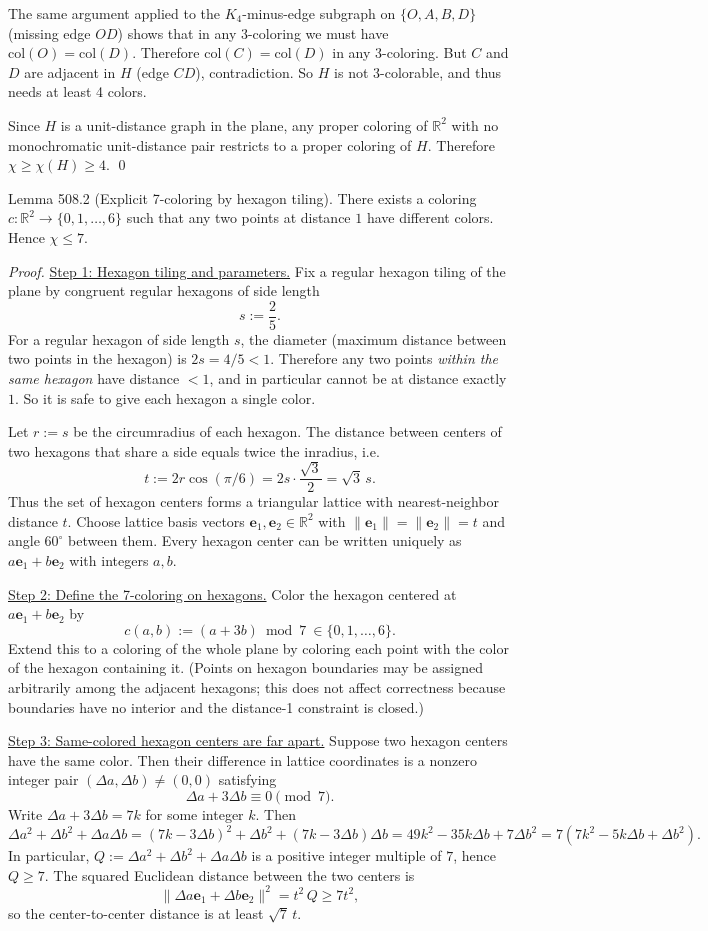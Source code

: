 The same argument applied to the $K_4$-minus-edge subgraph on $\{O,A,B,D\}$ (missing edge $OD$) shows that in any 3-coloring we must have $\mathrm{col}(O)=\mathrm{col}(D)$.
Therefore $\mathrm{col}(C)=\mathrm{col}(D)$ in any 3-coloring.
But $C$ and $D$ are adjacent in $H$ (edge $CD$), contradiction.
So $H$ is not 3-colorable, and thus needs at least 4 colors.

Since $H$ is a unit-distance graph in the plane, any proper coloring of $\mathbb R^2$ with no monochromatic unit-distance pair restricts to a proper coloring of $H$.
Therefore $\chi\ge \chi(H)\ge 4$.
\qed

Lemma 508.2 (Explicit 7-coloring by hexagon tiling).
There exists a coloring $c:\mathbb R^2\to\{0,1,\dots,6\}$ such that any two points at distance $1$ have different colors. Hence $\chi\le 7$.

\emph{Proof.}
\underline{Step 1: Hexagon tiling and parameters.}
Fix a regular hexagon tiling of the plane by congruent regular hexagons of side length
\[s:=\frac{2}{5}.
\]
For a regular hexagon of side length $s$, the diameter (maximum distance between two points in the hexagon) is $2s=4/5<1$.
Therefore any two points \emph{within the same hexagon} have distance $<1$, and in particular cannot be at distance exactly $1$.
So it is safe to give each hexagon a single color.

Let $r:=s$ be the circumradius of each hexagon. The distance between centers of two hexagons that share a side equals twice the inradius, i.e.
\[t:=2r\cos(\pi/6)=2s\cdot \frac{\sqrt3}{2}=\sqrt3\,s.
\]
Thus the set of hexagon centers forms a triangular lattice with nearest-neighbor distance $t$.
Choose lattice basis vectors $\mathbf e_1,\mathbf e_2\in\mathbb R^2$ with $\lVert\mathbf e_1\rVert=\lVert\mathbf e_2\rVert=t$ and angle $60^\circ$ between them.
Every hexagon center can be written uniquely as $a\mathbf e_1+b\mathbf e_2$ with integers $a,b$.

\underline{Step 2: Define the 7-coloring on hexagons.}
Color the hexagon centered at $a\mathbf e_1+b\mathbf e_2$ by
\[c(a,b):= (a+3b)\bmod 7\ \in\{0,1,\dots,6\}.
\]
Extend this to a coloring of the whole plane by coloring each point with the color of the hexagon containing it.
(Points on hexagon boundaries may be assigned arbitrarily among the adjacent hexagons; this does not affect correctness because boundaries have no interior and the distance-1 constraint is closed.)

\underline{Step 3: Same-colored hexagon centers are far apart.}
Suppose two hexagon centers have the same color. Then their difference in lattice coordinates is a nonzero integer pair $(\Delta a,\Delta b)\ne (0,0)$ satisfying
\[\Delta a + 3\Delta b \equiv 0\pmod 7.
\]
Write $\Delta a+3\Delta b=7k$ for some integer $k$.
Then
\[
\Delta a^2+\Delta b^2+\Delta a\Delta b
=(7k-3\Delta b)^2+\Delta b^2+(7k-3\Delta b)\Delta b
=49k^2-35k\Delta b+7\Delta b^2
=7(7k^2-5k\Delta b+\Delta b^2).
\]
In particular, $Q:=\Delta a^2+\Delta b^2+\Delta a\Delta b$ is a positive integer multiple of $7$, hence $Q\ge 7$.
The squared Euclidean distance between the two centers is
\[\lVert \Delta a\mathbf e_1+\Delta b\mathbf e_2\rVert^2 = t^2\,Q \ge 7t^2,
\]
so the center-to-center distance is at least $\sqrt7\,t$.

